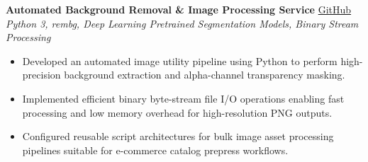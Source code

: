 \documentclass[a4paper,9pt]{extarticle}
\begin{document}
\vspace{5pt}
\noindent\textbf{Automated Background Removal \& Image Processing Service} \hfill \href{https://github.com/krabhishek9/Remove-Image-Background}{GitHub}\\
\textit{Python 3, rembg, Deep Learning Pretrained Segmentation Models, Binary Stream Processing}
\begin{itemize}
    \item Developed an automated image utility pipeline using Python to perform high-precision background extraction and alpha-channel transparency masking.
    \item Implemented efficient binary byte-stream file I/O operations enabling fast processing and low memory overhead for high-resolution PNG outputs.
    \item Configured reusable script architectures for bulk image asset processing pipelines suitable for e-commerce catalog prepress workflows.
\end{itemize}
\end{document}
